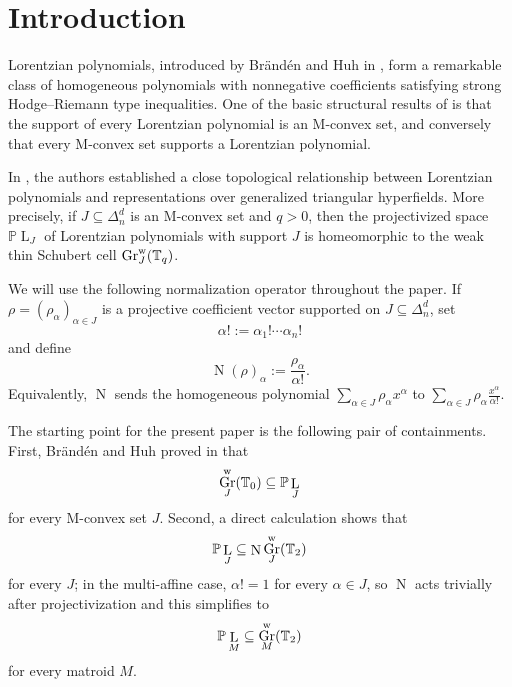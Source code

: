 \documentclass[12pt]{amsart}
\theoremstyle{definition}
\newcommand{\1}{\mathbf{1}}
\DeclareMathOperator{\upN}{N}   %
\DeclareMathOperator{\upL}{L}   %
\DeclareMathOperator{\Gr}{Gr}
\renewcommand\P{{\mathbb P}}
\newcommand\T{{\mathbb T}}
\newcommand\ol{\texorpdfstring{\textbf{Oliver:} }{Oliver: }}
\begin{document}
\maketitle

\tableofcontents


\section{Introduction}

Lorentzian polynomials, introduced by Br\"and\'en and Huh in \cite{Branden-Huh20}, form a remarkable class of homogeneous polynomials with nonnegative coefficients satisfying strong Hodge--Riemann type inequalities. One of the basic structural results of \cite{Branden-Huh20} is that the support of every Lorentzian polynomial is an M-convex set, and conversely that every M-convex set supports a Lorentzian polynomial.

In \cite{BHKL1}, the authors established a close topological relationship between Lorentzian polynomials and representations over generalized triangular hyperfields. More precisely, if $J\subseteq \Delta_n^d$ is an M-convex set and $q>0$, then the projectivized space $\P\upL_J$ of Lorentzian polynomials with support $J$ is homeomorphic to the weak thin Schubert cell $\Gr^{\rm w}_J(\T_q)$. 

We will use the following normalization operator throughout the paper.  If
$\rho=(\rho_\alpha)_{\alpha\in J}$ is a projective coefficient vector supported
on $J\subseteq \Delta_n^d$, set
\[
\alpha!:=\alpha_1!\cdots \alpha_n!
\]
and define
\[
\upN(\rho)_\alpha:=\frac{\rho_\alpha}{\alpha!}.
\]
Equivalently, $\upN$ sends the homogeneous polynomial
$\sum_{\alpha\in J}\rho_\alpha x^\alpha$
to $\sum_{\alpha\in J}\rho_\alpha \frac{x^\alpha}{\alpha!}$.



The starting point for the present paper is the following pair of containments.
First, Br\"and\'en and Huh proved in \cite{Branden-Huh20} that
\[
\Gr^{\rm w}_J(\T_0)\subseteq \P\upL_J
\]
for every M-convex set $J$.  Second, a direct calculation shows that
\[
\P\upL_J\subseteq \upN\Gr^{\rm w}_J(\T_2)
\]
for every $J$; in the multi-affine case, $\alpha!=1$ for every
$\alpha\in J$, so $\upN$ acts trivially after projectivization and this
simplifies to
\[
\P\upL_M\subseteq \Gr^{\rm w}_M(\T_2)
\]
for every matroid $M$.
\end{document}
